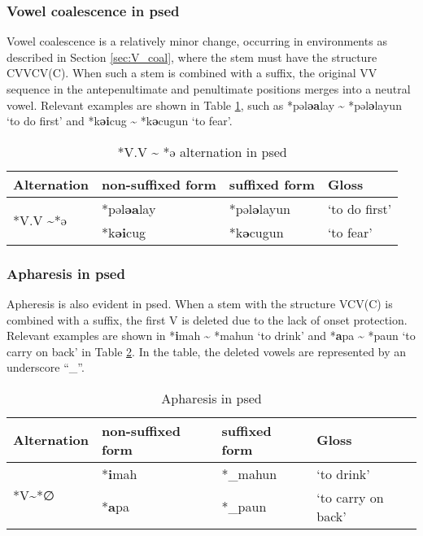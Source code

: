 \subsubsection{Vowel coalescence in \acl{psed}}

Vowel coalescence is a relatively minor change, occurring in environments as described in Section \ref{sec:V_coal}, where the stem must have the structure CVVCV(C). When such a stem is combined with a suffix, the original VV sequence in the antepenultimate and penultimate positions merges into a neutral vowel. Relevant examples are shown in Table \ref{tab:psed_VV2ə}, such as *pəl\textbf{əa}lay \~{} *pəl\textbf{ə}layun `to do first' and *k\textbf{əi}cug \~{} *k\textbf{ə}cugun `to fear'.

\begin{table}[!htbp]
\centering
\caption{*V.V \~{ } *ə alternation in \acl{psed}}
\label{tab:psed_VV2ə}
\begin{tabular}{llll}
\hline
Alternation        & non-suffixed form    & suffixed form & Gloss     \\ \hline
\multirow{2}{*}{*V.V \~{ }*ə}  & *pəl\textbf{əa}lay & *pəl\textbf{ə}layun     & `to do first' \\ 
                               & *k\textbf{əi}cug   & *k\textbf{ə}cugun       & `to fear' \\ \hline
\end{tabular}
\end{table}

\subsubsection{Apharesis in \acl{psed}} %

Apheresis is also evident in \acl{psed}. When a stem with the structure VCV(C) is combined with a suffix, the first V is deleted due to the lack of onset protection. Relevant examples are shown in *\textbf{i}mah \~{} *mahun `to drink' and *\textbf{a}pa \~{} *paun `to carry on back' in Table \ref{tab:psed_V20}. In the table, the deleted vowels are represented by an underscore “\_{}”.

\begin{table}[!htbp]
\centering
\caption{Apharesis in \acl{psed}}
\label{tab:psed_V20}
\begin{tabular}{llll}
\hline
Alternation                & non-suffixed form    & suffixed form & Gloss     \\ \hline
\multirow{2}{*}{*V\~{ }*∅} & *\textbf{i}mah & *\_mahun     & `to drink' \\
                           & *\textbf{a}pa & *\_paun     & `to carry on back'   \\ \hline
\end{tabular}
\end{table}

